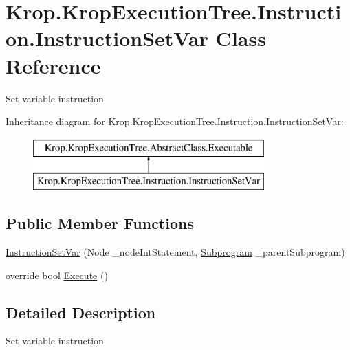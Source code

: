\hypertarget{class_krop_1_1_krop_execution_tree_1_1_instruction_1_1_instruction_set_var}{}\section{Krop.\+Krop\+Execution\+Tree.\+Instruction.\+Instruction\+Set\+Var Class Reference}
\label{class_krop_1_1_krop_execution_tree_1_1_instruction_1_1_instruction_set_var}


Set variable instruction  


Inheritance diagram for Krop.\+Krop\+Execution\+Tree.\+Instruction.\+Instruction\+Set\+Var\+:\begin{figure}[H]
\begin{center}
\leavevmode
\includegraphics[height=2.000000cm]{class_krop_1_1_krop_execution_tree_1_1_instruction_1_1_instruction_set_var}
\end{center}
\end{figure}
\subsection*{Public Member Functions}
\begin{DoxyCompactItemize}
\item 
\mbox{\hyperlink{class_krop_1_1_krop_execution_tree_1_1_instruction_1_1_instruction_set_var_ae6382baf6329f3c178978ffc01c64ac5}{Instruction\+Set\+Var}} (Node \+\_\+node\+Int\+Statement, \mbox{\hyperlink{class_krop_1_1_krop_execution_tree_1_1_subprogram}{Subprogram}} \+\_\+parent\+Subprogram)
\item 
override bool \mbox{\hyperlink{class_krop_1_1_krop_execution_tree_1_1_instruction_1_1_instruction_set_var_a1c6739bcdc66cc9f50a8c9810958ed9f}{Execute}} ()
\end{DoxyCompactItemize}


\subsection{Detailed Description}
Set variable instruction 



